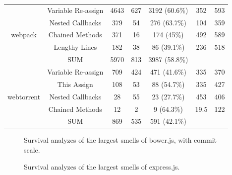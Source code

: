 \documentclass[smallcondensed]{svjour3}
\begin{document}
\begin{table}[!htbp]
{\begin{tabular}{c|c|c|c|c|c|c}
		\multirow{5}{*}{webpack}
		& Variable Re-assign & 4643 & 627 & 3192 (60.6\%) & 352 & 593 \\ \cline{2-7}
		& Nested Callbacks & 379 & 54 & 276 (63.7\%) & 104 & 359 \\ \cline{2-7}
		& Chained Methods & 371 & 16 & 174 (45\%) & 492 & 589 \\ \cline{2-7}
		& Lengthy Lines & 182 & 38 & 86 (39.1\%) & 236 & 518 \\ \cline{2-7}
		& SUM & 5970 & 813 & 3987 (58.8\%) & & \\ \hline
		\multirow{5}{*}{webtorrent}
		& Variable Re-assign & 709 & 424 & 471 (41.6\%) & 335 & 370 \\ \cline{2-7}
		& This Assign & 108 & 53 & 88 (54.7\%) & 335 & 427 \\ \cline{2-7}
		& Nested Callbacks & 28 & 55 & 23 (27.7\%) & 453 & 406 \\ \cline{2-7}
		& Chained Methods & 12 & 2 & 9 (64.3\%) & 19.5 & 122 \\ \cline{2-7}
		& SUM & 869 & 535 & 591 (42.1\%) & & \\ \hline
	\end{tabular}
	\label{survivalsmells}
}
\end{table}

\begin{figure}[!htbp]
	\centering%
	\caption{Survival analyzes of the largest smells of bower.js, with commit scale.\vspace{-10pt}}
	\label{survivalplotsbowercommitscale}
\end{figure}

\begin{figure}[!htbp]
	\centering%
	\caption{Survival analyzes of the largest smells of express.js.\vspace{-10pt}}
	\label{survivalplots1}
\end{figure}
\end{document}
